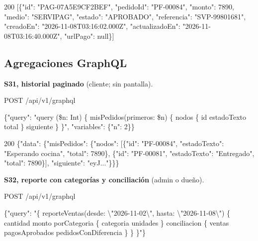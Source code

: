 \begin{codigo}
200 [\allowbreak{}\{"id":\allowbreak{} "PAG-\allowbreak{}07A5E9CF2BEF",\allowbreak{} "pedidoId":\allowbreak{} "PF-\allowbreak{}00084",\allowbreak{} "monto":\allowbreak{} 7890,\allowbreak{} "medio":\allowbreak{} "SERVIPAG",\allowbreak{} "estado":\allowbreak{} "APROBADO",\allowbreak{} "referencia":\allowbreak{} "SVP-\allowbreak{}99801681",\allowbreak{} "creadoEn":\allowbreak{} "2026-\allowbreak{}11-\allowbreak{}08T03:\allowbreak{}16:\allowbreak{}02.\allowbreak{}000Z",\allowbreak{} "actualizadoEn":\allowbreak{} "2026-\allowbreak{}11-\allowbreak{}08T03:\allowbreak{}16:\allowbreak{}40.\allowbreak{}000Z",\allowbreak{} "urlPago":\allowbreak{} null\}]\par
\end{codigo}

\subsection{Agregaciones GraphQL}

\textbf{S31, historial paginado} (cliente; sin pantalla).


\begin{codigo}
POST /\allowbreak{}api/\allowbreak{}v1/\allowbreak{}graphql\par
\{"query":\allowbreak{} "query (\allowbreak{}\$n:\allowbreak{} Int) \{ misPedidos(\allowbreak{}primeros:\allowbreak{} \$n) \{ nodos \{ id estadoTexto total \} siguiente \} \}",\allowbreak{} "variables":\allowbreak{} \{"n":\allowbreak{} 2\}\}\par
\end{codigo}

\begin{codigo}
200 \{"data":\allowbreak{} \{"misPedidos":\allowbreak{} \{"nodos":\allowbreak{} [\allowbreak{}\{"id":\allowbreak{} "PF-\allowbreak{}00084",\allowbreak{} "estadoTexto":\allowbreak{} "Esperando cocina",\allowbreak{} "total":\allowbreak{} 7890\},\allowbreak{} \{"id":\allowbreak{} "PF-\allowbreak{}00081",\allowbreak{} "estadoTexto":\allowbreak{} "Entregado",\allowbreak{} "total":\allowbreak{} 7890\}],\allowbreak{} "siguiente":\allowbreak{} "eyJ.\allowbreak{}.\allowbreak{}.\allowbreak{}"\}\}\}\par
\end{codigo}

\textbf{S32, reporte con categorías y conciliación} (admin o dueño).


\begin{codigo}
POST /\allowbreak{}api/\allowbreak{}v1/\allowbreak{}graphql\par
\{"query":\allowbreak{} "\{ reporteVentas(\allowbreak{}desde:\allowbreak{} \textbackslash{}"2026-\allowbreak{}11-\allowbreak{}02\textbackslash{}",\allowbreak{} hasta:\allowbreak{} \textbackslash{}"2026-\allowbreak{}11-\allowbreak{}08\textbackslash{}") \{ cantidad monto porCategoria \{ categoria unidades \} conciliacion \{ ventas pagosAprobados pedidosConDiferencia \} \} \}"\}\par
\end{codigo}

